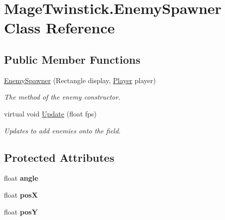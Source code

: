 \hypertarget{class_mage_twinstick_1_1_enemy_spawner}{}\section{Mage\+Twinstick.\+Enemy\+Spawner Class Reference}
\label{class_mage_twinstick_1_1_enemy_spawner}
\subsection*{Public Member Functions}
\begin{DoxyCompactItemize}
\item 
\hyperlink{class_mage_twinstick_1_1_enemy_spawner_abd353f77aec752709c47a110a15a1bb2}{Enemy\+Spawner} (Rectangle display, \hyperlink{class_mage_twinstick_1_1_player}{Player} player)
\begin{DoxyCompactList}\small\item\em The method of the enemy constructor. \end{DoxyCompactList}\item 
virtual void \hyperlink{class_mage_twinstick_1_1_enemy_spawner_a4e22661d16cc2c9671eefe32fda8a42e}{Update} (float fps)
\begin{DoxyCompactList}\small\item\em Updates to add enemies onto the field. \end{DoxyCompactList}\end{DoxyCompactItemize}
\subsection*{Protected Attributes}
\begin{DoxyCompactItemize}
\item 
\hypertarget{class_mage_twinstick_1_1_enemy_spawner_ae8e524a6c9480737390fcf8903c924b7}{}float {\bfseries angle}\label{class_mage_twinstick_1_1_enemy_spawner_ae8e524a6c9480737390fcf8903c924b7}

\item 
\hypertarget{class_mage_twinstick_1_1_enemy_spawner_afae9c62c10aab60fb5232880bdc58eef}{}float {\bfseries pos\+X}\label{class_mage_twinstick_1_1_enemy_spawner_afae9c62c10aab60fb5232880bdc58eef}

\item 
\hypertarget{class_mage_twinstick_1_1_enemy_spawner_a202528664dcf4d1107551469b7147a36}{}float {\bfseries pos\+Y}\label{class_mage_twinstick_1_1_enemy_spawner_a202528664dcf4d1107551469b7147a36}

\end{DoxyCompactItemize}


